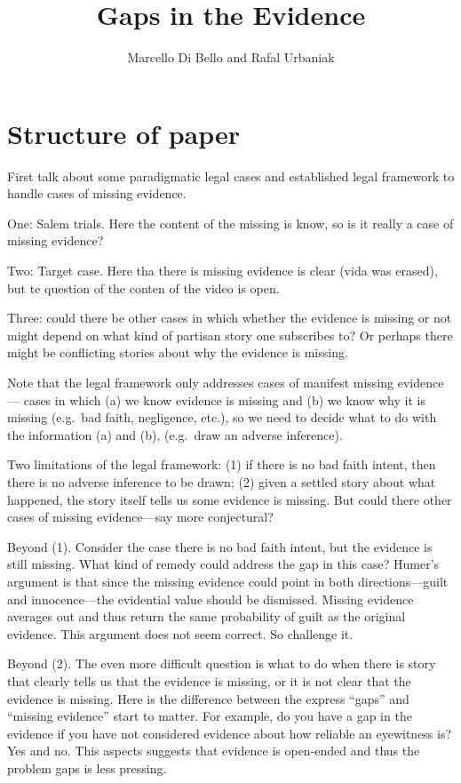 \documentclass[
  10pt,
  dvipsnames,enabledeprecatedfontcommands]{scrartcl}
\title{Gaps in the Evidence}
\author{Marcello Di Bello and Rafal Urbaniak}
\date{}
\begin{document}
\maketitle

\hypertarget{structure-of-paper}{%
\section{Structure of paper}\label{structure-of-paper}}

First talk about some paradigmatic legal cases and established legal
framework to handle cases of missing evidence.

One: Salem trials. Here the content of the missing is know, so is it
really a case of missing evidence?

Two: Target case. Here tha there is missing evidence is clear (vida was
erased), but te question of the conten of the video is open.

Three: could there be other cases in which whether the evidence is
missing or not might depend on what kind of partisan story one
subscribes to? Or perhaps there might be conflicting stories about why
the evidence is missing.

Note that the legal framework only addresses cases of manifest missing
evidence --- cases in which (a) we know evidence is missing and (b) we
know why it is missing (e.g.~bad faith, negligence, etc.), so we need to
decide what to do with the information (a) and (b), (e.g.~draw an
adverse inference).

Two limitations of the legal framework: (1) if there is no bad faith
intent, then there is no adverse inference to be drawn; (2) given a
settled story about what happened, the story itself tells us some
evidence is missing. But could there other cases of missing
evidence---say more conjectural?

Beyond (1). Consider the case there is no bad faith intent, but the
evidence is still missing. What kind of remedy could address the gap in
this case? Humer's argument is that since the missing evidence could
point in both directions---guilt and innocence---the evidential value
should be dismissed. Missing evidence averages out and thus return the
same probability of guilt as the original evidence. This argument does
not seem correct. So challenge it.

Beyond (2). The even more difficult question is what to do when there is
story that clearly tells us that the evidence is missing, or it is not
clear that the evidence is missing. Here is the difference between the
express ``gaps'' and ``missing evidence'' start to matter. For example,
do you have a gap in the evidence if you have not considered evidence
about how reliable an eyewitness is? Yes and no. This aspects suggests
that evidence is open-ended and thus the problem gaps is less pressing.
\end{document}
